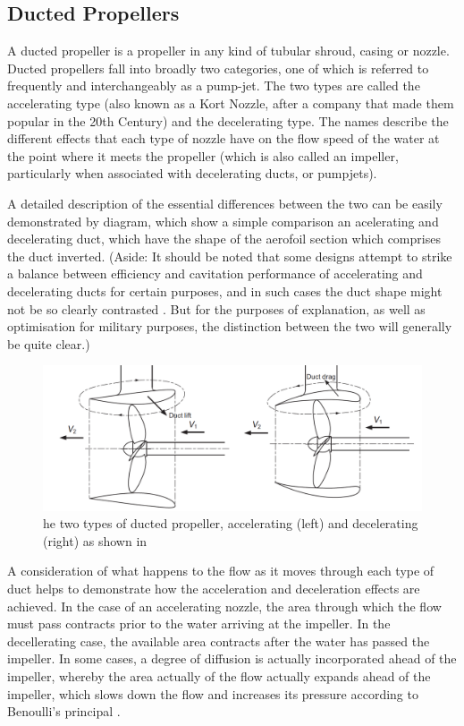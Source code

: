 \documentclass{article}\usepackage[]{graphicx}\usepackage[]{color}
\begin{document}
\subsection{Ducted Propellers}
A ducted propeller is a propeller in any kind of tubular shroud, casing or nozzle.  Ducted propellers fall into broadly two categories, one of which is referred to frequently and interchangeably as a pump-jet.  The two types are called the accelerating type (also known as a Kort Nozzle, after a company that made them popular in the 20th Century) and the decelerating type.  The names describe the different effects that each type of nozzle have on the flow speed of the water at the point where it meets the propeller (which is also called an impeller, particularly when associated with decelerating ducts, or pumpjets).

A detailed description of the essential differences between the two can be easily demonstrated by diagram, which show a simple comparison an acelerating and decelerating duct, which have the shape of the aerofoil section which comprises the duct inverted. (Aside: It should be noted that some designs attempt to strike a balance between efficiency and cavitation performance of accelerating and decelerating ducts for certain purposes, and in such cases the duct shape might not be so clearly contrasted \parencite{abdel2010}.  But for the purposes of explanation, as well as optimisation for military purposes, the distinction between the two will generally be quite clear.)

\begin{figure}
\includegraphics[width=\textwidth]{AccelDecel.png}
\caption{he two types of ducted propeller, accelerating (left) and decelerating (right) as shown in \parencite[249]{mollard2011}}
\label{fig:AccelDecel.png}
\end{figure}

A consideration of what happens to the flow as it moves through each type of duct helps to demonstrate how the acceleration and deceleration effects are achieved. In the case of an accelerating nozzle, the area through which the flow must pass contracts prior to the water arriving at the impeller.  In the decellerating case, the available area contracts after the water has passed the impeller. In some cases, a degree of diffusion is actually incorporated ahead of the impeller, whereby the area actually of the flow actually expands ahead of the impeller, which slows down the flow and increases its pressure according to Benoulli's principal \parencite{wislicenus1973}.
\end{document}
